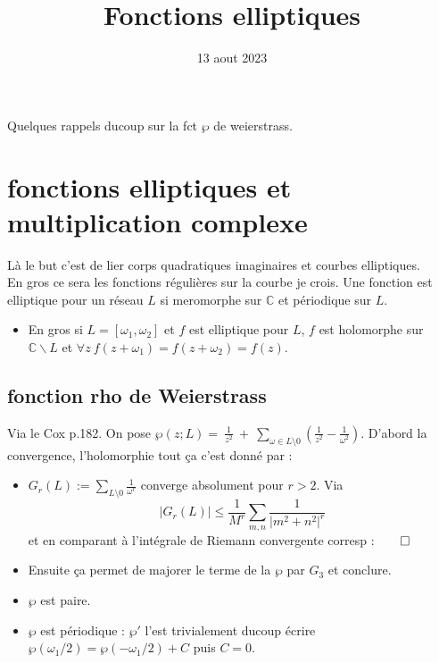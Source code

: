 \documentclass[12pt]{article}
\title{Fonctions elliptiques}
\date{13 aout 2023}
\theoremstyle{plain}
\theoremstyle{definition}
\theoremstyle{remark}
\newcommand{\C}{\mathbb{C}}
\newcommand{\w}{\omega}
\begin{document}
\tableofcontents
\maketitle

Quelques rappels ducoup sur la fct $\wp$ de weierstrass.
\section{fonctions elliptiques et multiplication complexe}
Là le but c'est de lier corps quadratiques imaginaires et courbes elliptiques.\\
En gros ce sera les fonctions régulières sur la courbe je crois. Une fonction est elliptique pour un réseau $L$ si meromorphe sur $\C$ et périodique sur 
$L$. 

\begin{itemize}
    \item En gros si $L=[\w_1, \w_2]$ et $f$ est elliptique pour $L$, $f$ est holomorphe sur $\C\backslash L$ et $\forall z~f(z+\w_1)=f(z+\w_2)=f(z)$.
\end{itemize}

\subsection{fonction rho de Weierstrass}
Via le Cox p.182. On pose $\wp(z;L)=~\frac{1}{z^2}~+~\sum_{\w\in L\setminus{0}}\left(\frac{1}{z^2}-\frac{1}{\w^2}\right)$. D'abord la convergence, l'holomorphie tout ça c'est donné par : 
\begin{itemize}
    \item $G_r(L):=\sum_{L\setminus{0}}\frac{1}{\w^r}$ converge absolument pour $r>2$. Via $$\lvert G_r(L)\rvert\leq\frac{1}{M^r}\sum_{m,n} \frac{1}{\lvert m^2+n^2\rvert^r}$$ et en comparant
à l'intégrale de Riemann convergente corresp :$\qed$
    \item Ensuite ça permet de majorer le terme de la $\wp$ par $G_3$ et conclure.
    \item $\wp$ est paire.
    \item $\wp$ est périodique : $\wp '$ l'est trivialement ducoup écrire $\wp(\w_1/2)=\wp(-\w_1/2)+C$ puis $C=0$.
\end{itemize}
\end{document}
